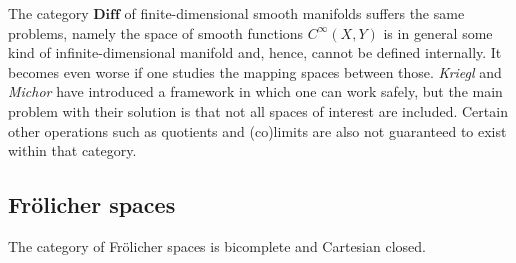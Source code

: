    The category $\mathbf{Diff}$ of finite-dimensional smooth manifolds suffers the same problems, namely the space of smooth functions $C^\infty(X,Y)$ is in general some kind of infinite-dimensional manifold and, hence, cannot be defined internally. It becomes even worse if one studies the mapping spaces between those. \textit{Kriegl} and \textit{Michor} have introduced a framework in which one can work safely, but the main problem with their solution is that not all spaces of interest are included. Certain other operations such as quotients and (co)limits are also not guaranteed to exist within that category.

\subsection{Fr\"olicher spaces}


    \begin{property}
        The category of Fr\"olicher spaces is bicomplete and Cartesian closed.
    \end{property}

